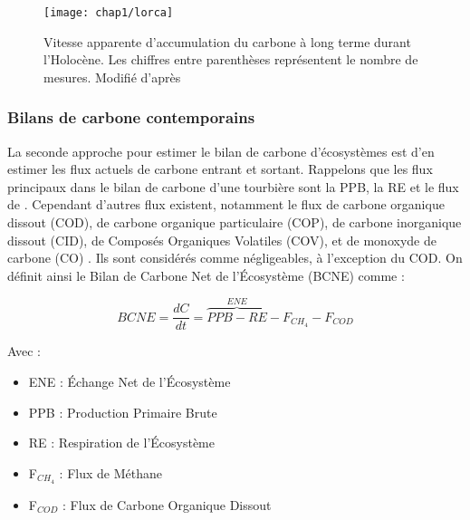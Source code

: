\begin{figure}
\centering
\texttt{[image: chap1/lorca]}
\caption{Vitesse apparente d'accumulation du carbone à long terme durant l'Holocène. Les chiffres entre parenthèses représentent le nombre de mesures. Modifié d'après \citet{yu2009}}
\label{fig:lorca}
\end{figure}

\subsubsection{Bilans de carbone contemporains}

La seconde approche pour estimer le bilan de carbone d'écosystèmes est d'en estimer les flux actuels de carbone entrant et sortant.
Rappelons que les flux principaux dans le bilan de carbone d'une tourbière sont la PPB, la RE et le flux de \chh.
Cependant d'autres flux existent, notamment le flux de carbone organique dissout (COD), de carbone organique particulaire (COP), de carbone inorganique dissout (CID), de Composés Organiques Volatiles (COV), et de monoxyde de carbone (CO) \citep{chapin2006}.
Ils sont considérés comme négligeables, à l'exception du COD.
On définit ainsi le Bilan de Carbone Net de l'Écosystème (BCNE) comme :

\begin{equation}
BCNE=\frac{dC}{dt}=\overbrace{PPB - RE}^{ENE} - F_{CH_{4}} - F_{COD}
\label{bdc}
\end{equation}

Avec : 
\begin{itemize}
\item ENE : Échange Net de l'Écosystème
\item PPB : Production Primaire Brute
\item RE : Respiration de l'Écosystème
\item F$_{CH_{4}}$ : Flux de Méthane
\item F$_{COD}$ : Flux de Carbone Organique Dissout
\end{itemize}

